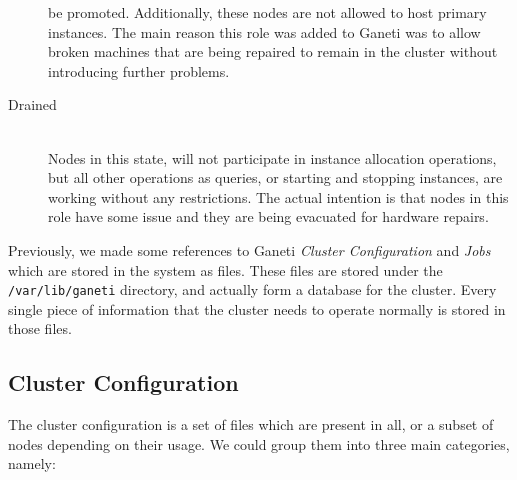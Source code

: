 \begin{description}
    be promoted. Additionally, these nodes are not allowed to host primary
    instances. The main reason this role was added to Ganeti was to allow
    broken machines that are being repaired to remain in the cluster without
    introducing further problems.\\
  \item[Drained] \hfill \\
    Nodes in this state, will not participate in instance allocation operations,
    but all other operations as queries, or starting and stopping instances, are
    working without any restrictions. The actual intention is that nodes in this
    role have some issue and they are being evacuated for hardware repairs.
\end{description}

Previously, we made some references to Ganeti \emph{Cluster Configuration} and
\emph{Jobs} which are stored in the system as files. These files are stored
under the \texttt{/var/lib/ganeti} directory, and actually form a database for
the cluster. Every single piece of information that the cluster needs to operate
normally is stored in those files.

\subsection{Cluster Configuration}\label{subsec:config}

The cluster configuration is a set of files which are present in all, or a
subset of nodes depending on their usage. We could group them into three main
categories, namely:

